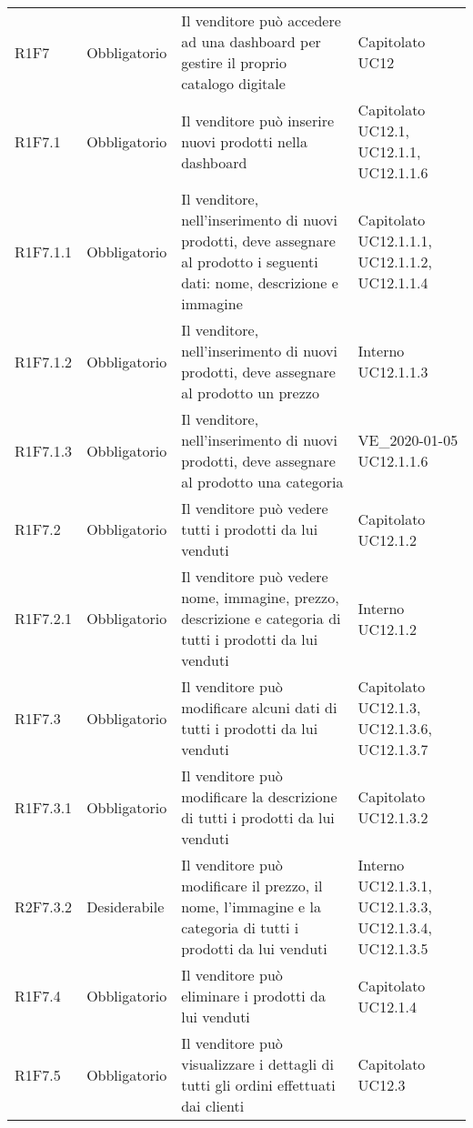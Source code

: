 {\begin{longtable}{C{2.5cm} C{2.8cm} C{6.7cm} C{2.5cm}}
R1F7 & Obbligatorio & Il venditore può accedere ad una dashboard per gestire il proprio catalogo digitale & Capitolato \newline UC12\\
R1F7.1 & Obbligatorio & Il venditore può inserire nuovi prodotti nella dashboard & Capitolato \newline UC12.1, UC12.1.1, UC12.1.1.6\\
R1F7.1.1 & Obbligatorio & Il venditore, nell'inserimento di nuovi prodotti, deve assegnare al prodotto i seguenti dati: nome, descrizione e immagine & Capitolato \newline UC12.1.1.1, UC12.1.1.2, UC12.1.1.4\\
R1F7.1.2 & Obbligatorio & Il venditore, nell'inserimento di nuovi prodotti, deve assegnare al prodotto un prezzo & Interno \newline UC12.1.1.3\\ 
R1F7.1.3 & Obbligatorio & Il venditore, nell'inserimento di nuovi prodotti, deve assegnare al prodotto una categoria & VE\_2020-01-05 \newline UC12.1.1.6\\ 
R1F7.2 & Obbligatorio & Il venditore può vedere tutti i prodotti da lui venduti & Capitolato \newline UC12.1.2 \\
R1F7.2.1 & Obbligatorio & Il venditore può vedere nome, immagine, prezzo, descrizione e categoria di tutti i prodotti da lui venduti & Interno \newline UC12.1.2\\
R1F7.3 & Obbligatorio & Il venditore può modificare alcuni dati di tutti i prodotti da lui venduti & Capitolato \newline UC12.1.3, UC12.1.3.6, UC12.1.3.7 \\
R1F7.3.1 & Obbligatorio & Il venditore può modificare la descrizione di tutti i prodotti da lui venduti & Capitolato \newline UC12.1.3.2\\
R2F7.3.2 & Desiderabile & Il venditore può modificare il prezzo, il nome, l'immagine e la categoria di tutti i prodotti da lui venduti & Interno \newline UC12.1.3.1, UC12.1.3.3, UC12.1.3.4, UC12.1.3.5\\
R1F7.4 & Obbligatorio & Il venditore può eliminare i prodotti da lui venduti & Capitolato \newline UC12.1.4 \\
R1F7.5 & Obbligatorio & Il venditore può visualizzare i dettagli di tutti gli ordini effettuati dai clienti & Capitolato \newline UC12.3\\

\end{longtable}}
